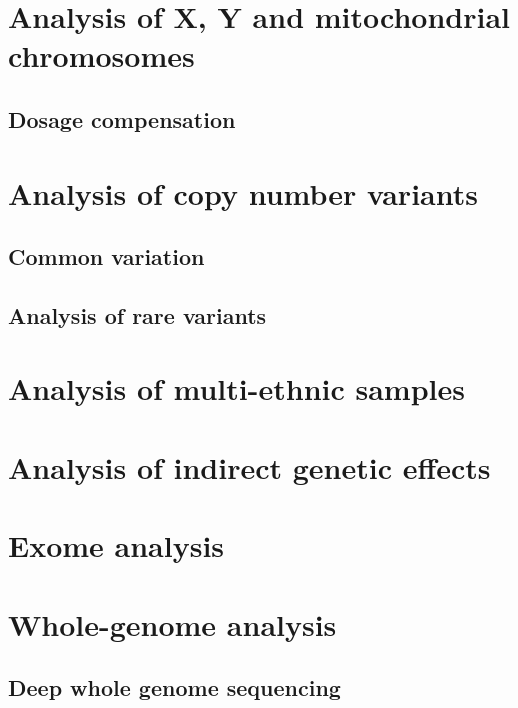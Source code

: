 \documentclass[]{book}
\theoremstyle{definition}
\theoremstyle{definition}
\theoremstyle{definition}
\theoremstyle{remark}
\begin{document}
\section{Analysis of X, Y and mitochondrial
chromosomes}\label{analysis-of-x-y-and-mitochondrial-chromosomes}

\subsection{Dosage compensation}\label{dosage-compensation}

\section{Analysis of copy number
variants}\label{analysis-of-copy-number-variants}

\subsection{Common variation}\label{common-variation}

\subsection{Analysis of rare
variants}\label{analysis-of-rare-variants-1}

\section{Analysis of multi-ethnic
samples}\label{analysis-of-multi-ethnic-samples}

\section{Analysis of indirect genetic
effects}\label{analysis-of-indirect-genetic-effects}

\section{Exome analysis}\label{exome-analysis}

\section{Whole-genome analysis}\label{whole-genome-analysis}

\subsection{Deep whole genome
sequencing}\label{deep-whole-genome-sequencing}
\end{document}
